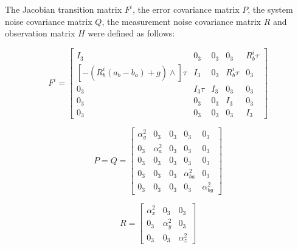 \documentclass[conference]{IEEEtran}
\begin{document}
The Jacobian transition matrix $F^{i}$, the error covariance matrix $P$, the system noise covariance matrix $Q$, the measurement noise covariance matrix $R$ and observation matrix $H$ were defined as follows:

\begin{equation}
F^{i} = \left[ \begin{matrix}                         I_{3}  &     0_{3} & 0_{3} &         0_{3} & R^{i}_{b}\tau \\
                    [-(R^{i}_{b}(a_{b}-b_{a})+g)\wedge]\tau  &     I_{3} & 0_{3} & R^{i}_{b}\tau &         0_{3} \\
                                                        0_{3} & I_{3}\tau & I_{3} &         0_{3} &         0_{3} \\
                                                        0_{3} &     0_{3} & 0_{3} &         I_{3} &         0_{3} \\
                                                        0_{3} &     0_{3} & 0_{3} &         0_{3} &         I_{3} 
                \end{matrix} \right] \label{eskf_f}
\end{equation}

\begin{equation}
P = Q = \left[   \begin{matrix} \alpha^{2}_{g} &          0_{3} & 0_{3} &           0_{3} &           0_{3} \\
                                        0_{3} & \alpha^{2}_{a} & 0_{3} &           0_{3} &           0_{3} \\
                                        0_{3} &          0_{3} & 0_{3} &           0_{3} &           0_{3} \\
                                        0_{3} &          0_{3} & 0_{3} & \alpha^{2}_{ba} &           0_{3} \\
                                        0_{3} &          0_{3} & 0_{3} &           0_{3} & \alpha^{2}_{bg} 
                \end{matrix} \right] \label{eskf_pq}
\end{equation}

\begin{equation}
R = \left[    \begin{matrix} \alpha^{2}_{x} &          0_{3} &          0_{3} \\
                                        0_{3} & \alpha^{2}_{y} &          0_{3} \\
                                        0_{3} &          0_{3} & \alpha^{2}_{z}  
                \end{matrix} \right] \label{eskf_r}
\end{equation}
\end{document}
